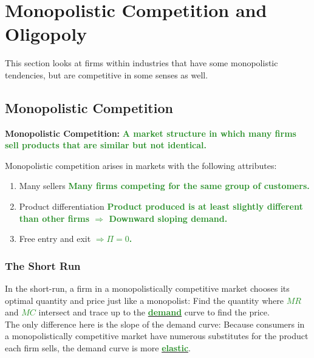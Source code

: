 \documentclass[11pt]{article}\usepackage[]{graphicx}\usepackage[]{color}
\theoremstyle{definition}
\newcommand{\ddp}[1]{{\textbf{\textcolor{ForestGreen}{#1}}}}
\newcommand{\dd}[1]{{\underline{\textbf{\textcolor{ForestGreen}{#1}}}}}
\newcommand{\defn}[1]{\textbf{#1}}
\begin{document}
\newpage	
	
	\section{Monopolistic Competition and Oligopoly}
	
	This section looks at firms within industries that have some monopolistic tendencies, but are competitive in some senses as well.
	
	\subsection{Monopolistic Competition}
	
	\defn{Monopolistic Competition:} \ddp{A market structure in which many firms sell products that are similar but not identical.\\}
	
	Monopolistic competition arises in markets with the following attributes:
	\begin{enumerate}
		\setlength\itemsep{1em}
		\item Many sellers \ddp{Many firms competing for the same group of customers.}
		\item Product differentiation \ddp{Product produced is at least slightly different than other firms $\Rightarrow$ Downward sloping demand.}
		\item Free entry and exit \ddp{$\Rightarrow \Pi = 0$.}
	\end{enumerate}
	
	\subsubsection*{The Short Run}
	
	In the short-run, a firm in a monopolistically competitive market chooses its optimal quantity and price just like a monopolist: Find the quantity where \dd{$MR$} and \dd{$MC$} intersect and trace up to the \dd{demand} curve to find the price. 
	\\
	
	The only difference here is the slope of the demand curve: Because consumers in a monopolistically competitive market have numerous substitutes for the product each firm sells, the demand curve is more \dd{elastic}. 
	\\
	
\end{document}
